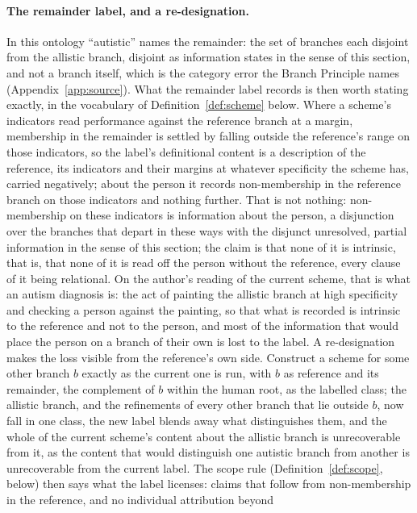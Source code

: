 
\paragraph{The remainder label, and a re-designation.} In this ontology ``autistic'' names the remainder: the set of branches each disjoint from the allistic branch, disjoint as information states in the sense of this section, and not a branch itself, which is the category error the Branch Principle names (Appendix~\ref{app:source}). What the remainder label records is then worth stating exactly, in the vocabulary of Definition~\ref{def:scheme} below. Where a scheme's indicators read performance against the reference branch at a margin, membership in the remainder is settled by falling outside the reference's range on those indicators, so the label's definitional content is a description of the reference, its indicators and their margins at whatever specificity the scheme has, carried negatively; about the person it records non-membership in the reference branch on those indicators and nothing further. That is not nothing: non-membership on these indicators is information about the person, a disjunction over the branches that depart in these ways with the disjunct unresolved, partial information in the sense of this section; the claim is that none of it is intrinsic, that is, that none of it is read off the person without the reference, every clause of it being relational. On the author's reading of the current scheme, that is what an autism diagnosis is: the act of painting the allistic branch at high specificity and checking a person against the painting, so that what is recorded is intrinsic to the reference and not to the person, and most of the information that would place the person on a branch of their own is lost to the label. A re-designation makes the loss visible from the reference's own side. Construct a scheme for some other branch $b$ exactly as the current one is run, with $b$ as reference and its remainder, the complement of $b$ within the human root, as the labelled class; the allistic branch, and the refinements of every other branch that lie outside $b$, now fall in one class, the new label blends away what distinguishes them, and the whole of the current scheme's content about the allistic branch is unrecoverable from it, as the content that would distinguish one autistic branch from another is unrecoverable from the current label. The scope rule (Definition~\ref{def:scope}, below) then says what the label licenses: claims that follow from non-membership in the reference, and no individual attribution beyond 